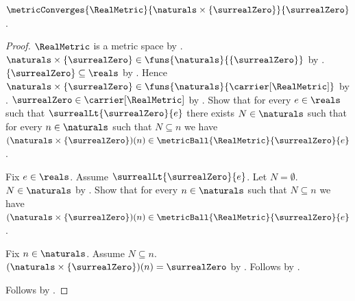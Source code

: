 \begin{proposition}\label{real_zero_sequence_converges_zero}
    $\metricConverges{\RealMetric}
        {\naturals\times\{\surrealZero\}}{\surrealZero}$.
\end{proposition}
\begin{proof}
    $\RealMetric$ is a metric space by .
    $\naturals\times\{\surrealZero\}\in
        \funs{\naturals}{\{\surrealZero\}}$
        by .
    $\{\surrealZero\}\subseteq\reals$
        by .
    Hence $\naturals\times\{\surrealZero\}\in
        \funs{\naturals}{\carrier[\RealMetric]}$
        by
        .
    $\surrealZero\in\carrier[\RealMetric]$
        by
        .
    Show that for every $e\in\reals$ such that
        $\surrealLt{\surrealZero}{e}$ there exists $N\in\naturals$
        such that for every $n\in\naturals$ such that $N\subseteq n$
            we have $(\naturals\times\{\surrealZero\})(n)
                \in\metricBall{\RealMetric}{\surrealZero}{e}$.
    \begin{subproof}
        Fix $e\in\reals$.
        Assume $\surrealLt{\surrealZero}{e}$.
        Let $N=\emptyset$.
        $N\in\naturals$ by .
        Show that for every $n\in\naturals$ such that
            $N\subseteq n$ we have
            $(\naturals\times\{\surrealZero\})(n)
                \in\metricBall{\RealMetric}{\surrealZero}{e}$.
        \begin{subproof}
            Fix $n\in\naturals$.
            Assume $N\subseteq n$.
            $(\naturals\times\{\surrealZero\})(n)=\surrealZero$
                by .
            Follows by
                .
        \end{subproof}
    \end{subproof}
    Follows by .
\end{proof}

